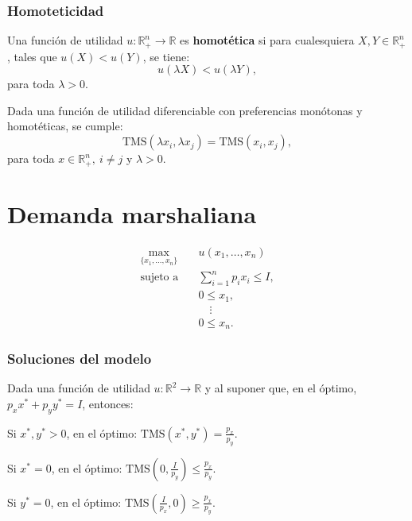 \documentclass[8pt,a4paper]{extarticle}
\begin{document}
\begin{multicols}{3}
	\subsubsection*{Homoteticidad}

	\begin{boxdef}[Homoteticidad]
		Una función de utilidad $u : \mathbb{R}^n_+ \to \mathbb{R}$ es \textbf{homotética} si para cualesquiera $X, Y \in \mathbb{R}^n_+$, tales que $u(X) < u(Y)$, se tiene:
		\[
			u(\lambda X ) < u(\lambda Y)
			,\]
		para toda $\lambda > 0$.
	\end{boxdef}

	\begin{boxtheo}
		Dada una función de utilidad diferenciable con preferencias monótonas y homotéticas, se cumple:
		\[
			\text{TMS} (\lambda x_i, \lambda x_j) = \text{TMS} (x_i, x_j)
			,\] para toda $x \in \mathbb{R}^n_+,\ i \neq j$ y $\lambda > 0$.
	\end{boxtheo}

	\newpage

	\section{Demanda marshaliana}

	\begin{equation*}
		\begin{aligned}
			\max_{\{x_1, \ldots, x_n\}}\	 & u(x_1, \ldots, x_n)           \\
			\text{sujeto a} \quad        & \sum_{i=1}^{n} p_i x_i \le I, \\
			                             & 0 \le x_1,                    \\
			                             & \quad \vdots                  \\
			                             & 0 \le x_n.
		\end{aligned}
	\end{equation*}

	\subsubsection*{Soluciones del modelo}

	Dada una función de utilidad $u : \mathbb{R}^2 \to \mathbb{R}$ y al suponer que, en el óptimo, $p_x x^* + p_y y^* = I$, entonces:

	\begin{bulletlist}
		\item Si $x^*, y^* > 0$, en el óptimo: $\displaystyle \text{TMS} (x^*, y^*) = \frac{p_x}{p_y}$.
		\item Si $x^* = 0$, en el óptimo: $\displaystyle \text{TMS} \left(0, \frac{I}{p_y}\right) \le \frac{p_x}{p_y}$.
		\item Si $y^* = 0$, en el óptimo: $\displaystyle \text{TMS} \left(\frac{I}{p_x}, 0\right) \ge \frac{p_x}{p_y}$.
	\end{bulletlist}


\end{multicols}
\end{document}
